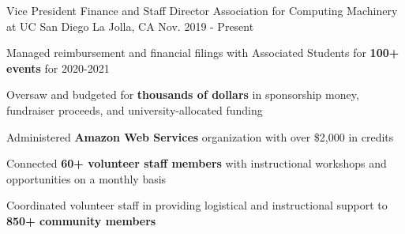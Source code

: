 
\begin{cventries}

  \cventry
    {Vice President Finance and Staff Director} %
    {Association for Computing Machinery at UC San Diego} %
    {La Jolla, CA} %
    {Nov. 2019 - Present} %
    {
      \begin{cvitems} %
        \item {Managed reimbursement and financial filings with Associated Students for \textbf{100+ events} for 2020-2021}
        \item {Oversaw and budgeted for \textbf{thousands of dollars} in sponsorship money, fundraiser proceeds, and university-allocated funding}
        \item {Administered \textbf{Amazon Web Services} organization with over \$2,000 in credits}
        \item {Connected \textbf{60+ volunteer staff members} with instructional workshops and opportunities on a monthly basis}
        \item {Coordinated volunteer staff in providing logistical and instructional support to \textbf{850+ community members}}
      \end{cvitems}
    }



\end{cventries}
